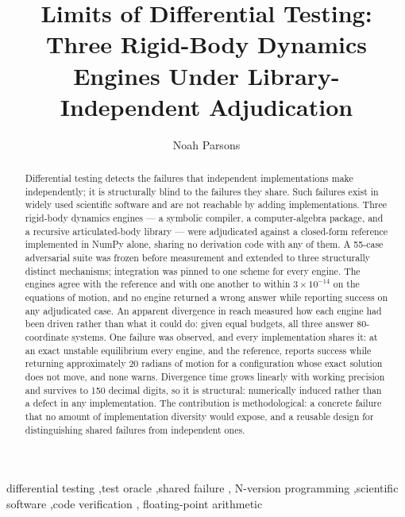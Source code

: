 \documentclass[review,12pt]{elsarticle}
\begin{document}
\begin{frontmatter}

\title{Limits of Differential Testing: Three Rigid-Body Dynamics Engines
Under Library-Independent Adjudication}

\author[ind]{Noah Parsons}


\begin{abstract}
Differential testing detects the failures that independent implementations make
independently; it is structurally blind to the failures they share. Such failures exist in
widely used scientific software and are not reachable by adding
implementations. Three rigid-body dynamics engines ---
a symbolic compiler, a computer-algebra package, and a recursive
articulated-body library --- were adjudicated against a closed-form
reference implemented in NumPy alone, sharing no derivation code with any of
them. A 55-case adversarial suite was frozen before measurement and extended to
three structurally distinct mechanisms; integration was pinned to one scheme
for every engine. The engines agree with the
reference and with one another to within $3\times10^{-14}$ on the equations of
motion, and no engine returned a wrong answer while reporting success on any
adjudicated case. An
apparent divergence in reach measured how each engine had been driven rather
than what it could do: given equal budgets, all three answer 80-coordinate
systems. One failure was observed, and every implementation
shares it: at an exact unstable equilibrium every engine, and the reference,
reports success while returning approximately 20 radians of motion for a
configuration whose exact solution does not move, and none warns. Divergence time grows linearly with
working precision and survives to 150 decimal digits, so it is structural:
numerically induced rather than a defect in any implementation. The
contribution is methodological: a concrete failure that no amount of
implementation diversity would expose, and a reusable design for
distinguishing shared failures from independent ones.
\end{abstract}

\begin{keyword}
differential testing \sep test oracle \sep shared failure \sep
N-version programming \sep scientific software \sep code verification \sep
floating-point arithmetic
\end{keyword}

\end{frontmatter}
\end{document}
